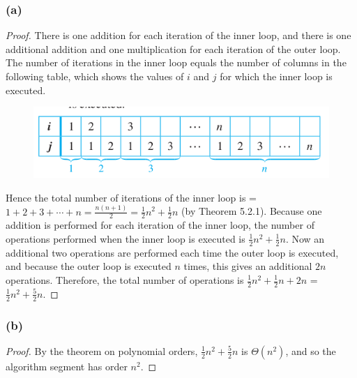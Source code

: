 \documentclass[14pt]{extarticle}
\begin{document}
\subsubsection{(a)}
\begin{proof}
    There is one addition for each iteration of the inner loop, and there is one additional addition and one multiplication
    for each iteration of the outer loop. The number of iterations in the inner loop equals the number of columns in the
    following table, which shows the values of \(i\) and \(j\) for which the inner loop is executed.

    \begin{figure}[ht!]
        \centering
        \includegraphics[scale=0.5]{../images/11.3.14.a.png}
    \end{figure}

    Hence the total number of iterations of the inner loop is = \(1 + 2 + 3 + \cdots + n = \frac{n(n+1)}{2} = \frac{1}{2}n^2 +
    \frac{1}{2}n\) (by Theorem 5.2.1). Because one addition is performed for each iteration of the inner loop, the number of
    operations performed when the inner loop is executed is \(\frac{1}{2}n^2 + \frac{1}{2}n\). Now an additional two
    operations are performed each time the outer loop is executed, and because the outer loop is executed \(n\) times, this gives
    an additional \(2n\) operations. Therefore, the total number of operations is \(\frac{1}{2}n^2 + \frac{1}{2}n + 2n\)
    = \(\frac{1}{2}n^2 + \frac{5}{2}n\).
\end{proof}

\subsubsection{(b)}
\begin{proof}
    By the theorem on polynomial orders, \(\frac{1}{2}n^2 + \frac{5}{2}n\) is \(\Theta(n^2)\), and so the algorithm
    segment has order \(n^2\).
\end{proof}
\end{document}
